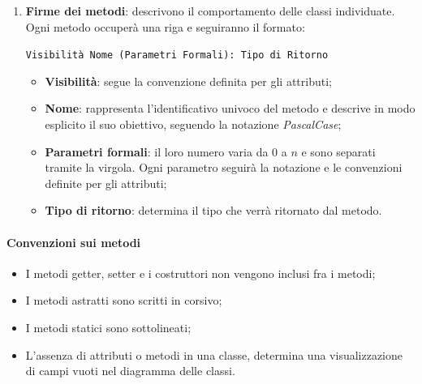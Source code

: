 \begin{enumerate}
    \item \textbf{Firme dei metodi}: descrivono il comportamento delle classi individuate. Ogni metodo occuperà una riga e seguiranno il formato: \\
    \begin{center} \texttt{Visibilità Nome (Parametri Formali): Tipo di Ritorno} \end{center}
    \begin{itemize}
        \item \textbf{Visibilità}: segue la convenzione definita per gli attributi;
        \item \textbf{Nome}: rappresenta l'identificativo univoco del metodo e descrive in modo esplicito il suo obiettivo, seguendo la notazione \textit{PascalCase};
        \item \textbf{Parametri formali}: il loro numero varia da $0$ a $n$ e sono separati tramite la virgola. Ogni parametro seguirà la notazione e le convenzioni definite per gli attributi;
        \item \textbf{Tipo di ritorno}: determina il tipo che verrà ritornato dal metodo.
    \end{itemize}
\end{enumerate}

\pagebreak

\paragraph*{Convenzioni sui metodi}
\begin{itemize}
    \item I metodi getter, setter e i costruttori non vengono inclusi fra i metodi;
    \item I metodi astratti sono scritti in corsivo; 
    \item I metodi statici sono sottolineati;
    \item L'assenza di attributi o metodi in una classe, determina una visualizzazione di campi vuoti nel diagramma delle classi.
\end{itemize}

